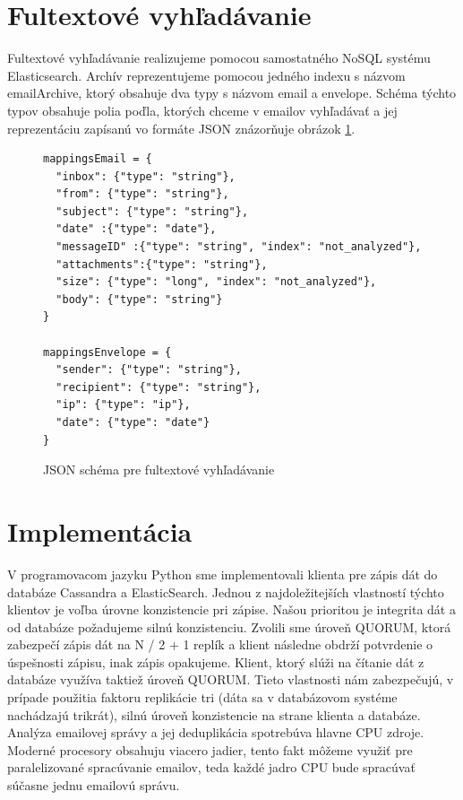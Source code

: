 \documentclass[11pt,twoside,a4paper]{book}
\begin{document}
\section{Fultextové vyhľadávanie}

Fultextové vyhľadávanie realizujeme pomocou samostatného NoSQL systému Elasticsearch. Archív reprezentujeme pomocou jedného indexu s názvom emailArchive, ktorý obsahuje dva typy s názvom email a envelope. Schéma týchto typov obsahuje polia poďla, ktorých chceme v emailov vyhľadávať a jej reprezentáciu zapísanú vo formáte JSON znázorňuje obrázok \ref{fig:ESschema}.

\begin{figure}[h]
\begin{verbatim}
mappingsEmail = {
  "inbox": {"type": "string"},
  "from": {"type": "string"},
  "subject": {"type": "string"},
  "date" :{"type": "date"},
  "messageID" :{"type": "string", "index": "not_analyzed"},
  "attachments":{"type": "string"},
  "size": {"type": "long", "index": "not_analyzed"},
  "body": {"type": "string"}
}   
            
mappingsEnvelope = {
  "sender": {"type": "string"},
  "recipient": {"type": "string"},
  "ip": {"type": "ip"},
  "date": {"type": "date"}
}     
\end{verbatim}
 \caption{JSON schéma pre fultextové vyhľadávanie}
 \label{fig:ESschema}
\end{figure}      


\section{Implementácia}

V programovacom jazyku Python sme implementovali klienta pre zápis dát do databáze Cassandra a ElasticSearch. Jednou z najdoležitejších vlastností týchto klientov je voľba úrovne konzistencie pri zápise. Našou prioritou je integrita dát a od databáze požadujeme silnú konzistenciu. Zvolili sme úroveň QUORUM, ktorá zabezpečí zápis dát na N / 2 + 1 replík a klient následne obdrží potvrdenie o úspešnosti zápisu, inak zápis opakujeme. Klient, ktorý slúži na čítanie dát z databáze využíva taktiež úroveň QUORUM. Tieto vlastnosti nám zabezpečujú, v prípade použitia faktoru replikácie tri (dáta sa v databázovom systéme nachádzajú trikrát), silnú úroveň konzistencie na strane klienta a databáze. Analýza emailovej správy a jej deduplikácia spotrebúva hlavne CPU zdroje. Moderné procesory obsahuju viacero jadier, tento fakt môžeme využiť pre paralelizované spracúvanie emailov, teda každé jadro CPU bude spracúvať súčasne jednu emailovú správu.
\end{document}
